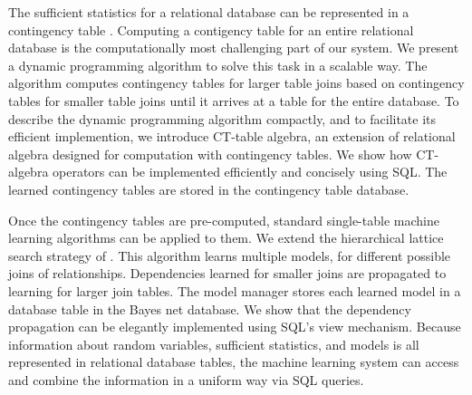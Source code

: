 \documentclass{acm_proc_article-sp}
\begin{document}
The sufficient statistics for a relational database can be represented in a contingency table \cite{Moore1998}. 
Computing a contigency table for an entire relational database is the computationally most challenging part of our system. 
We present a dynamic programming algorithm to solve this task in a scalable way. 
The algorithm computes contingency tables for larger table joins based on contingency tables for smaller table joins until it arrives at a table for the entire database. 
To describe the dynamic programming algorithm compactly, and to facilitate its efficient implemention, we introduce CT-table algebra, an extension of relational algebra designed for computation with contingency tables. 
We show how CT-algebra operators can be implemented efficiently and concisely using SQL. 
The learned contingency tables are stored in the contingency table database.

Once the contingency tables are pre-computed, standard single-table machine learning algorithms can be applied to them. 
We extend the hierarchical lattice search strategy of
\cite{Schulte2012,Qian_LNAI_2014}. 
This algorithm learns multiple models, for different possible joins of relationships. 
Dependencies learned for smaller joins are propagated to learning for larger join tables.  
The model manager stores each learned model in a database table in the Bayes net database. 
We show that the dependency propagation can be elegantly implemented using SQL's view mechanism.
Because information about random variables, sufficient statistics, and models 
is all represented in relational database tables,
the machine learning system can access and combine the information in a uniform way via SQL queries.
\end{document}
